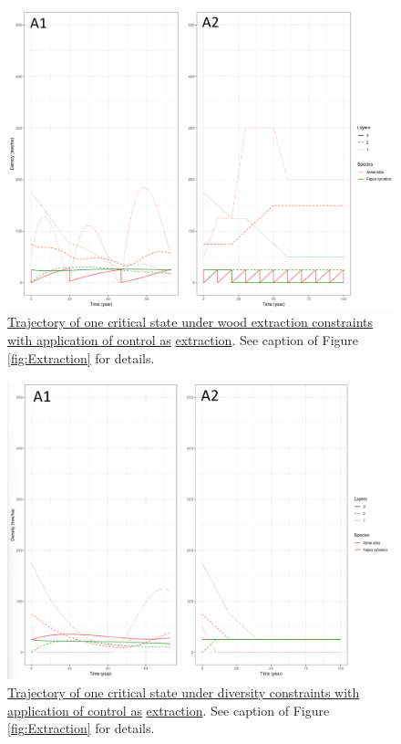 \documentclass{article}
\begin{document}
\begin{figure}[h]
    \centering
    \includegraphics[height=0.3\textheight]{Figure/Results/Extraction_2.png}
    \caption{\underline{Trajectory of one critical state under wood extraction constraints with application of control as}
    \underline{extraction}. See caption of Figure \ref{fig:Extraction} for details.}
    \label{fig:Extraction2}
\end{figure}

\begin{figure}[h]
    \centering
    \includegraphics[height=0.3\textheight]{Figure/Results/Diversity_2.png}
    \caption{\underline{Trajectory of one critical state under diversity constraints with application of control as} \underline{extraction}. See caption of Figure \ref{fig:Extraction} for details.}
    \label{fig:Diversity2}
\end{figure}
 
\end{document}
